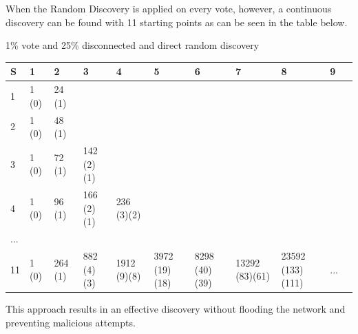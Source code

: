 When the Random Discovery is applied on every vote, however, a continuous discovery can be found with 11 starting points as can be seen in the table below.

1\% vote and 25\% disconnected and direct random discovery
\begin{table}[h!]
	\begin{tabular}{@{}l|llllllllll@{}}
		\toprule
		S & 1     & 2        & 3         & 4         & 5         & 6         & 7   & 8 & 9  \\ \midrule
		1   & 1 (0) & 24 (1)   &     &        &           &           &      & &         \\
		2   & 1 (0) & 48 (1)   &    &     &      &           &         & &      \\
		3   & 1 (0) & 72 (1)   & 142 (2)(1)   &    &        &           &      & &         \\
		4   & 1 (0) & 96 (1)  & 166 (2)(1)  & 236 (3)(2)   &    &       &     & &          \\
		... &       &          &           &           &           &           &      & &       \\
		11  & 1 (0) & 264 (1)  & 882 (4)(3)   & 1912 (9)(8)  &  3972 (19)(18)  &  8298 (40)(39)     &  13292 (83)(61) &  23592 (133)(111) & ... \\ \bottomrule
	\end{tabular}
\end{table}

This approach results in an effective discovery without flooding the network and preventing malicious attempts.

